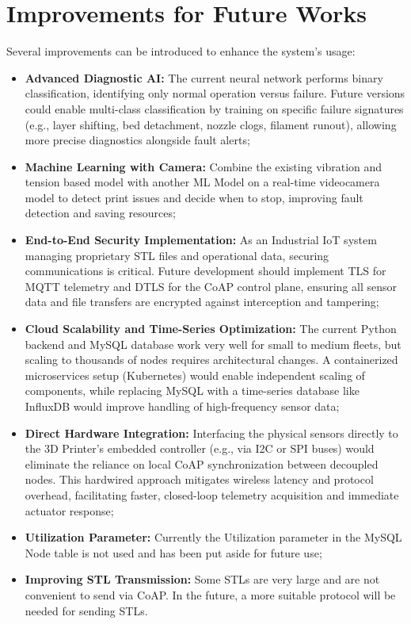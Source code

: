 \section{Improvements for Future Works}
Several improvements can be introduced to enhance the system's usage:
\begin{itemize}
	\item \textbf{Advanced Diagnostic AI:} The current neural network performs binary classification, identifying only normal operation versus failure. Future versions could enable multi-class classification by training on specific failure signatures (e.g., layer shifting, bed detachment, nozzle clogs, filament runout), allowing more precise diagnostics alongside fault alerts;
	\item \textbf{Machine Learning with Camera:} Combine the existing vibration and tension based model with another ML Model on a real-time videocamera model to detect print issues and decide when to stop, improving fault detection and saving resources; 
	\item \textbf{End-to-End Security Implementation:} As an Industrial IoT system managing proprietary STL files and operational data, securing communications is critical. Future development should implement TLS for MQTT telemetry and DTLS for the CoAP control plane, ensuring all sensor data and file transfers are encrypted against interception and tampering;
	\newpage
	\item \textbf{Cloud Scalability and Time-Series Optimization:} The current Python backend and MySQL database work very well for small to medium fleets, but scaling to thousands of nodes requires architectural changes. A containerized microservices setup (Kubernetes) would enable independent scaling of components, while replacing MySQL with a time-series database like InfluxDB would improve handling of high-frequency sensor data; 
	\item \textbf{Direct Hardware Integration:} Interfacing the physical sensors directly to the 3D Printer's embedded controller (e.g., via I2C or SPI buses) would eliminate the reliance on local CoAP synchronization between decoupled nodes. This hardwired approach mitigates wireless latency and protocol overhead, facilitating faster, closed-loop telemetry acquisition and immediate actuator response;
	\item \textbf{Utilization Parameter:} Currently the Utilization parameter in the MySQL Node table is not used and has been put aside for future use;
	\item \textbf{Improving STL Transmission:} Some STLs are very large and are not convenient to send via CoAP. In the future, a more suitable protocol will be needed for sending STLs.
\end{itemize}